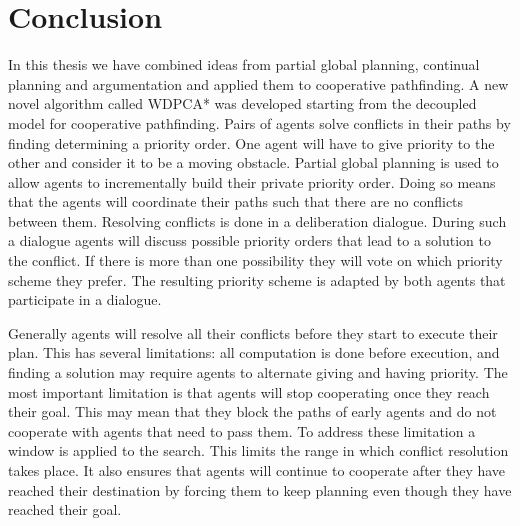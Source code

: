 

\section{Conclusion}
In this thesis we have combined ideas from partial global planning, continual
planning and argumentation and applied them to cooperative pathfinding.
A new novel algorithm called WDPCA* was developed starting from the decoupled
model for cooperative pathfinding. Pairs of agents solve conflicts in their
paths by finding determining a priority order. One agent will have to give
priority to the other and consider it to be a moving obstacle. Partial global
planning is used to allow agents to incrementally build their private priority
order. Doing so means that the agents will coordinate their paths such that
there are no conflicts between them. Resolving conflicts is done in a
deliberation dialogue. During such a dialogue agents will discuss possible
priority orders that lead to a solution to the conflict. If there is more than
one possibility they will vote on which priority scheme they prefer. The
resulting priority scheme is adapted by both agents that participate in a
dialogue.

Generally agents will resolve all their conflicts before they start to execute
their plan. This has several limitations: all computation is done before
execution, and finding a solution may require agents to alternate giving and
having priority. The most important limitation is that agents will stop
cooperating once they reach their goal. This may mean that they block the paths
of early agents and do not cooperate with agents that need to pass them. To
address these limitation a window is applied to the search. This limits the
range in which conflict resolution takes place. It also ensures that agents
will continue to cooperate after they have reached their destination by forcing
them to keep planning even though they have reached their goal.

